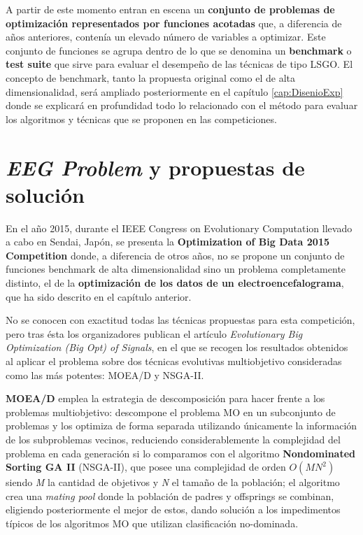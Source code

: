 A partir de este momento entran en escena un \textbf{conjunto de problemas de optimización representados por funciones acotadas} que, a diferencia de años anteriores, contenía un elevado número de variables a optimizar. Este conjunto de funciones se agrupa dentro de lo que se denomina un \textbf{benchmark} o \textbf{test suite} que sirve para evaluar el desempeño de las técnicas de tipo LSGO. El concepto de benchmark, tanto la propuesta original como el de alta dimensionalidad, será ampliado posteriormente en el capítulo \ref{cap:DisenioExp} donde se explicará en profundidad todo lo relacionado con el método para evaluar los algoritmos y técnicas que se proponen en las competiciones.

\section{\textit{EEG Problem} y propuestas de solución}

En el año 2015, durante el IEEE Congress on Evolutionary Computation llevado a cabo en Sendai, Japón\cite{IEEE-CEC2015}, se presenta la  \textbf{Optimization of Big Data 2015 Competition}\cite{CompetitionBigOpt} donde, a diferencia de otros años, no se propone un conjunto de funciones benchmark de alta dimensionalidad sino un problema completamente distinto, el de la \textbf{optimización de los datos de un electroencefalograma}, que ha sido descrito en el capítulo anterior.

No se conocen con exactitud todas las técnicas propuestas para esta competición, pero tras ésta los organizadores publican el artículo \textit{Evolutionary Big Optimization (Big Opt) of Signals}\cite{EvolutionaryBigOpt}, en el que se recogen los resultados obtenidos al aplicar el problema sobre dos técnicas evolutivas multiobjetivo consideradas como las más potentes: MOEA/D y NSGA-II.

\textbf{MOEA/D}\cite{MOEA/D} emplea la estrategia de descomposición para hacer frente a los problemas multiobjetivo: descompone el problema MO en un subconjunto de problemas y los optimiza de forma separada utilizando únicamente la información de los subproblemas vecinos, reduciendo considerablemente la complejidad del problema en cada generación si lo comparamos con el algoritmo \textbf{Nondominated Sorting GA II} (NSGA-II)\cite{NSGA-II}, que posee una complejidad de orden $O(MN^2)$ siendo \textit{M} la cantidad de objetivos y \textit{N} el tamaño de la población; el algoritmo crea una \textit{mating pool} donde la población de padres y offsprings se combinan, eligiendo posteriormente el mejor de estos, dando solución a los impedimentos típicos de los algoritmos MO que utilizan clasificación no-dominada.

